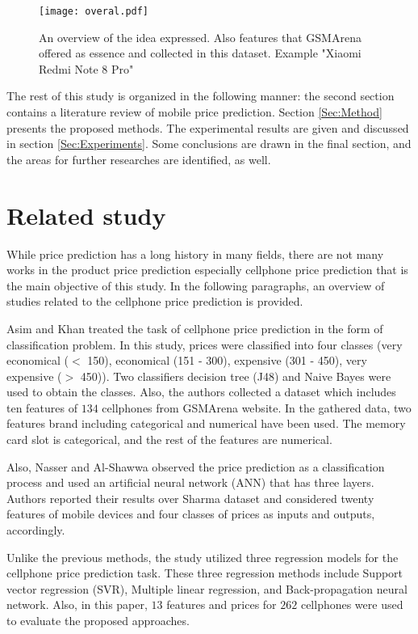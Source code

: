 \documentclass{svjour3}                     \smartqed  \usepackage{graphicx}
\begin{document}
\begin{figure*}
	\centering
	\texttt{[image: overal.pdf]}
	\caption{An overview of the idea expressed. Also features that GSMArena offered as essence and collected in this dataset. Example "Xiaomi Redmi Note 8 Pro"}
	\label{Fig:Overal}
\end{figure*}

The rest of this study is organized in the following manner: the second section contains a literature review of mobile price prediction. Section \ref{Sec:Method} presents the proposed methods. The experimental results are given and discussed in section \ref{Sec:Experiments}. Some conclusions are drawn in the final section, and the areas for further researches are identified, as well.

\section{Related study} \label{Sec:Related-study}
While price prediction has a long history in many fields, there are not many works in the product price prediction especially cellphone price prediction that is the main objective of this study. In the following paragraphs, an overview of studies related to the cellphone price prediction is provided. 

Asim  and  Khan \cite{Asim2018} treated the task of cellphone price prediction in the form of classification problem. In this study, prices were classified into four classes (very economical ($<$ 150), economical (151 - 300), expensive (301 - 450), very expensive ($>$ 450)). Two classifiers decision tree (J48) and Naive Bayes were used to obtain the classes. Also, the authors collected a dataset which includes ten features of $134$ cellphones from GSMArena website. In the gathered data, two features brand including categorical and numerical have been used. The memory card slot is categorical, and the rest of the features are numerical.

Also, Nasser and Al-Shawwa \cite{Nasser2019} observed the price prediction as a classification process and used an artificial neural network (ANN) that has three layers. Authors reported their results over Sharma  \cite{Sharma} dataset and considered twenty features of mobile devices and four classes of prices as inputs and outputs, accordingly.  

Unlike the previous methods, the study \cite{Chandrashekhara2019} utilized three regression models for the cellphone price prediction task. These three regression methods include Support vector regression (SVR), Multiple linear regression, and Back-propagation neural network. Also, in this paper, $13$ features and prices for $262$ cellphones were used to evaluate the proposed approaches.
\end{document}
